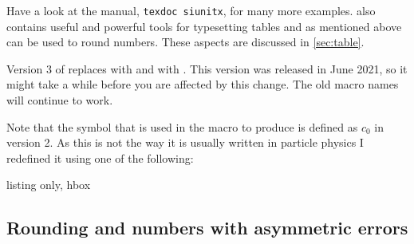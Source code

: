 Have a look at the manual, \texttt{texdoc siunitx}, for many more
examples.  also contains useful and powerful tools
for typesetting tables and as mentioned above can be used to round
numbers. These aspects are discussed in \cref{sec:table}.

Version 3 of  replaces  with 
and  with .
This version was released in June 2021,
so it might take a while before you are affected by this change.
The old macro names will continue to work.

Note that the  symbol that is used in the macro
 to produce \unit{\MeVovercsq} is defined as \(c_{0}\) in
 version 2. As this is not the way it is usually
written in particle physics I redefined it using one of the following:
\begin{tcblisting}{listing only, hbox}
\DeclareSIUnit{}   %
\DeclareSIUnit{} %
\end{tcblisting}

\subsection{Rounding and numbers with asymmetric errors}%
\label{sec:tips:pmerr}

